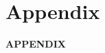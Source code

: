 \documentclass[11pt, a4paper]{article} %
\begin{document}
\newpage
\TODO\section{Appendix}
\vspace*{\fill}
{\Huge \begin{center}\textbf{APPENDIX}\end{center}}
\vspace*{\fill}\clearpage


\renewcommand\thefigure{A.\arabic{figure}}
\setcounter{figure}{0} 
\captionsetup[subfigure]{labelformat=parens}




\end{document}
